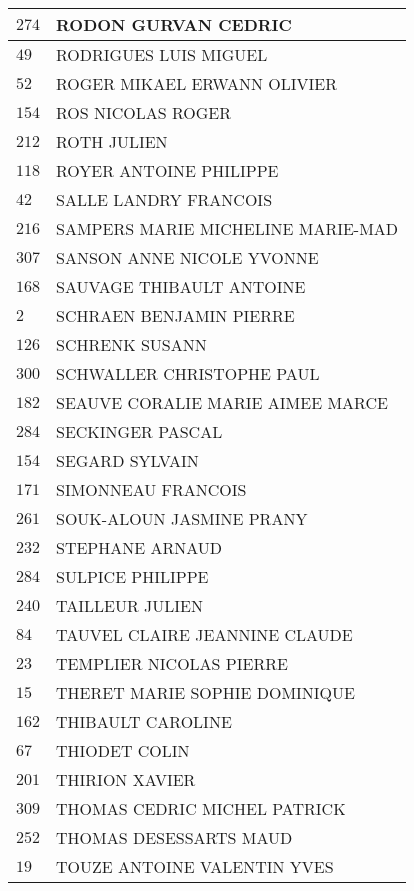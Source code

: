 \begin{xltabular}{\linewidth}{|l|X|}
    \hline
    $274$ & RODON GURVAN CEDRIC \\
    \hline
    $49$ & RODRIGUES LUIS MIGUEL \\
    \hline
    $52$ & ROGER MIKAEL ERWANN OLIVIER \\
    \hline
    $154$ & ROS NICOLAS ROGER \\
    \hline
    $212$ & ROTH JULIEN \\
    \hline
    $118$ & ROYER ANTOINE PHILIPPE \\
    \hline
    $42$ & SALLE LANDRY FRANCOIS \\
    \hline
    $216$ & SAMPERS MARIE MICHELINE MARIE-MAD \\
    \hline
    $307$ & SANSON ANNE NICOLE YVONNE \\
    \hline
    $168$ & SAUVAGE THIBAULT ANTOINE \\
    \hline
    $2$ & SCHRAEN BENJAMIN PIERRE \\
    \hline
    $126$ & SCHRENK SUSANN \\
    \hline
    $300$ & SCHWALLER CHRISTOPHE PAUL \\
    \hline
    $182$ & SEAUVE CORALIE MARIE AIMEE MARCE \\
    \hline
    $284$ & SECKINGER PASCAL \\
    \hline
    $154$ & SEGARD SYLVAIN \\
    \hline
    $171$ & SIMONNEAU FRANCOIS \\
    \hline
    $261$ & SOUK-ALOUN JASMINE PRANY \\
    \hline
    $232$ & STEPHANE ARNAUD \\
    \hline
    $284$ & SULPICE PHILIPPE \\
    \hline
    $240$ & TAILLEUR JULIEN \\
    \hline
    $84$ & TAUVEL CLAIRE JEANNINE CLAUDE \\
    \hline
    $23$ & TEMPLIER NICOLAS PIERRE \\
    \hline
    $15$ & THERET MARIE SOPHIE DOMINIQUE \\
    \hline
    $162$ & THIBAULT CAROLINE \\
    \hline
    $67$ & THIODET COLIN \\
    \hline
    $201$ & THIRION XAVIER \\
    \hline
    $309$ & THOMAS CEDRIC MICHEL PATRICK \\
    \hline
    $252$ & THOMAS DESESSARTS MAUD \\
    \hline
    $19$ & TOUZE ANTOINE VALENTIN YVES \\

\end{xltabular}
